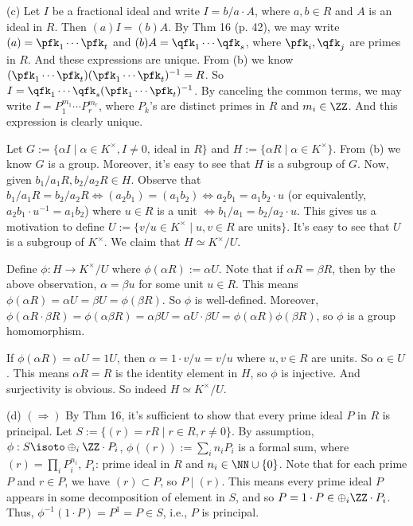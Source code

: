 \documentclass[../Chapter.tex]{subfiles}
\begin{document}
(c) Let $I$ be a fractional ideal and write $I=b/a\cdot A$, where $a,b\in R$ and $A$ is an ideal in $R$. Then $(a)I=(b)A$. By Thm 16 (p. 42), we may write $(a)=\pfk_1\cdots\pfk_t$ and $(b)A=\qfk_1\cdots\qfk_s$, where $\pfk_i,\qfk_j$ are primes in $R$. And these expressions are unique. From (b) we know $(\pfk_1\cdots\pfk_t)(\pfk_1\cdots\pfk_t)^{-1}=R$. So $I=\qfk_1\cdots\qfk_s(\pfk_1\cdots\pfk_t)^{-1}$. By canceling the common terms, we may write $I=P_1^{m_1}\cdots P_r^{m_r}$, where $P_k$'s are distinct primes in $R$ and $m_i\in\ZZ$. And this expression is clearly unique.

Let $G:=\{\alpha I\mid \alpha\in K^\times, I\neq 0\text{, ideal in } R\}$ and $H:=\{\alpha R\mid \alpha\in K^\times\}$. From (b) we know $G$ is a group. Moreover, it's easy to see that $H$ is a subgroup of $G$. Now, given $b_1/a_1R, b_2/a_2R\in H$. Observe that $b_1/a_1R=b_2/a_2R \iff (a_2b_1)=(a_1b_2) \iff a_2b_1=a_1b_2\cdot u$ (or equivalently, $a_2b_1\cdot u^{-1}=a_1b_2$) where $u\in R$ is a unit $\iff b_1/a_1=b_2/a_2\cdot u$. This gives us a motivation to define $U:=\{v/u\in K^\times\mid u,v\in R\text{ are units}\}$. It's easy to see that $U$ is a subgroup of $K^\times$. We claim that $H\simeq K^\times/U$.

Define $\phi:H\to K^\times/U$ where $\phi(\alpha R):=\alpha U$. Note that if $\alpha R=\beta R$, then by the above observation, $\alpha=\beta u$ for some unit $u\in R$. This means $\phi(\alpha R)=\alpha U=\beta U=\phi(\beta R)$. So $\phi$ is well-defined. Moreover, $\phi(\alpha R\cdot \beta R)=\phi(\alpha\beta R)=\alpha\beta U=\alpha U\cdot \beta U=\phi(\alpha R)\phi(\beta R)$, so $\phi$ is a group homomorphism.

If $\phi(\alpha R)=\alpha U=1U$, then $\alpha=1\cdot v/u=v/u$ where $u,v\in R$ are units. So $\alpha\in U$. This means $\alpha R=R$ is the identity element in $H$, so $\phi$ is injective. And surjectivity is obvious. So indeed $H\simeq K^\times/U$.

(d) $(\Rightarrow)$ By Thm 16, it's sufficient to show that every prime ideal $P$ in $R$ is principal. Let $S:=\{(r)=rR\mid r\in R,r\neq 0\}$. By assumption, $\phi:S\isoto \oplus_{i} \ZZ\cdot P_i$, $\phi((r)):=\sum_i n_iP_i$ is a formal sum, where $(r)=\prod_i P_i^{n_i}$, $P_i$: prime ideal in $R$ and $n_i\in\NN\cup\{0\}$. Note that for each prime $P$ and $r\in P$, we have $(r)\subset P$, so $P\mid (r)$. This means every prime ideal $P$ appears in some decomposition of element in $S$, and so $P=1\cdot P\in \oplus_{i} \ZZ\cdot P_i$. Thus, $\phi^{-1}(1\cdot P)=P^1=P\in S$, i.e., $P$ is principal.
\end{document}
